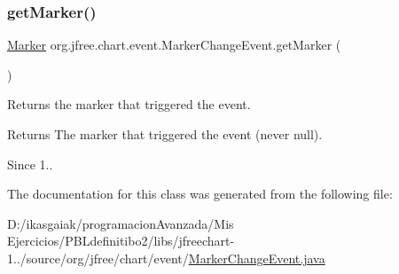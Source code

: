 \subsubsection{\texorpdfstring{get\+Marker()}{getMarker()}}
{\footnotesize\ttfamily \mbox{\hyperlink{classorg_1_1jfree_1_1chart_1_1plot_1_1_marker}{Marker}} org.\+jfree.\+chart.\+event.\+Marker\+Change\+Event.\+get\+Marker (\begin{DoxyParamCaption}{ }\end{DoxyParamCaption})}

Returns the marker that triggered the event.

\begin{DoxyReturn}{Returns}
The marker that triggered the event (never {\ttfamily null}).
\end{DoxyReturn}
\begin{DoxySince}{Since}
1.. 
\end{DoxySince}


The documentation for this class was generated from the following file\+:\begin{DoxyCompactItemize}
\item 
D\+:/ikasgaiak/programacion\+Avanzada/\+Mis Ejercicios/\+P\+B\+Ldefinitibo2/libs/jfreechart-\/1../source/org/jfree/chart/event/\mbox{\hyperlink{_marker_change_event_8java}{Marker\+Change\+Event.\+java}}\end{DoxyCompactItemize}

